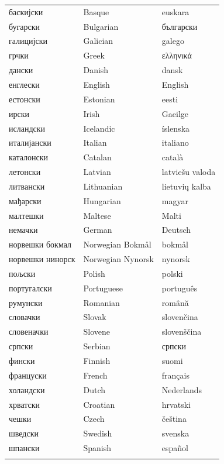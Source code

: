 \begin{center}
\begin{tabulary}{170mm}{LLL} \toprule
  баскијски & Basque & euskara\\
  бугарски & Bulgarian & български \\
  галицијски & Galician & galego\\
  грчки & Greek & ελληνικά \\
  дански & Danish & dansk\\
  енглески & English & English\\
  естонски & Estonian & eesti\\
  ирски & Irish & Gaeilge\\
  исландски & Icelandic & íslenska \\
  италијански & Italian & italiano\\
  каталонски & Catalan & català \\
  летонски & Latvian &  latviešu valoda\\
  литвански & Lithuanian & lietuvių kalba\\
  мађарски & Hungarian & magyar\\
  малтешки & Maltese & Malti\\
  немачки & German & Deutsch\\
  норвешки бокмал & Norwegian Bokmål & bokmål \\
  норвешки нинорск & Norwegian Nynorsk & nynorsk\\
  пољски & Polish & polski\\
  португалски & Portuguese & português\\
  румунски & Romanian & română\\
  словачки & Slovak & slovenčina\\
  словеначки & Slovene & slovenščina\\
  српски & Serbian & српски \\
  фински & Finnish & suomi\\
  француски & French & français\\
  холандски & Dutch & Nederlands\\
  хрватски & Croatian & hrvatski\\
  чешки & Czech & čeština\\
 шведски & Swedish & svenska\\
 шпански & Spanish & español\\
   \addlinespace \bottomrule
\end{tabulary}
\end{center}
